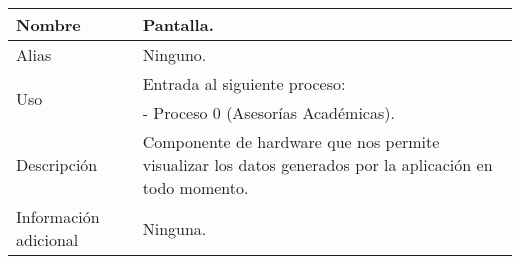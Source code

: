 \begin{center}
  \begin{tabular}{| l | p{9cm} |}
    \hline
    Nombre & \textbf{Pantalla}.\\
    \hline
    Alias & Ninguno.\\
    \hline
    \multirow{2}{*}{Uso} & Entrada al siguiente proceso:\\
                         & - Proceso 0 (Asesorías Académicas).\\
    \hline
    Descripción & Componente de hardware que nos permite visualizar los datos
                  generados por la aplicación en todo momento.\\
    \hline
    Información adicional & Ninguna.\\
    \hline
  \end{tabular}
\end{center}
